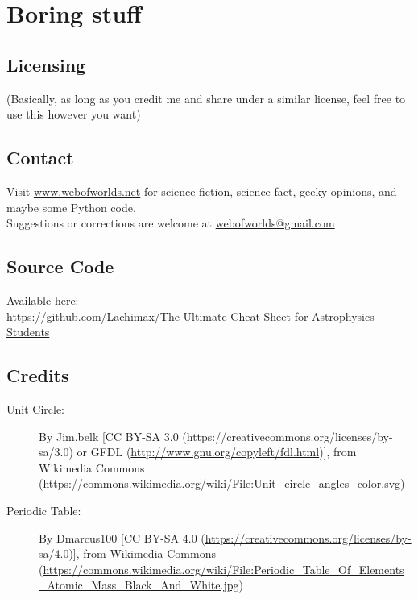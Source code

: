 \chapter{Boring stuff}

\section{Licensing}

\doclicenseThis
    
\noindent(Basically, as long as you credit me and share under a similar license, feel free to use this however you want)

\section{Contact}
\noindent Visit \url{www.webofworlds.net} for science fiction, science fact, geeky opinions, and maybe some Python code. \\ 
Suggestions or corrections are welcome at \url{webofworlds@gmail.com}
\\

\section{Source Code}

Available here:
\\\url{https://github.com/Lachimax/The-Ultimate-Cheat-Sheet-for-Astrophysics-Students}



\section{Credits}

\begin{description}
\item [Unit Circle:] By Jim.belk [CC BY-SA 3.0 (https://creativecommons.org/licenses/by-sa/3.0) or GFDL (\url{http://www.gnu.org/copyleft/fdl.html})], from Wikimedia Commons (\url{https://commons.wikimedia.org/wiki/File:Unit_circle_angles_color.svg})
\item [Periodic Table:] By Dmarcus100 [CC BY-SA 4.0 (\url{https://creativecommons.org/licenses/by-sa/4.0})], from Wikimedia Commons (\url{https://commons.wikimedia.org/wiki/File:Periodic_Table_Of_Elements_Atomic_Mass_Black_And_White.jpg})
\end{description}

